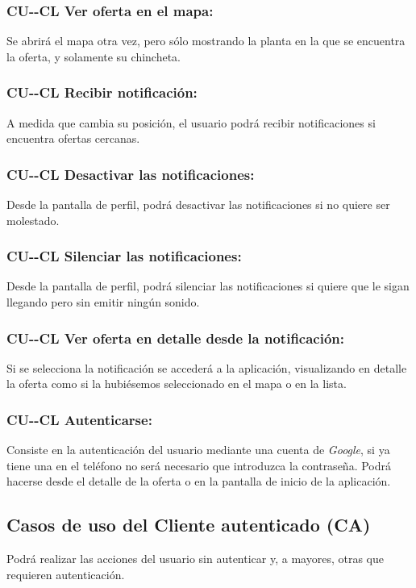 \subsubsection*{CU-\theUseCase-CL Ver oferta en el mapa:}
Se abrirá el mapa otra vez, pero sólo mostrando la planta en la que se encuentra la oferta, y solamente su chincheta.
\subsubsection*{CU-\theUseCase-CL Recibir notificación:}
A medida que cambia su posición, el usuario podrá recibir notificaciones si encuentra ofertas cercanas.
\subsubsection*{CU-\theUseCase-CL Desactivar las notificaciones:}
Desde la pantalla de perfil, podrá desactivar las notificaciones si no quiere ser molestado.
\subsubsection*{CU-\theUseCase-CL Silenciar las notificaciones:}
Desde la pantalla de perfil, podrá silenciar las notificaciones si quiere que le sigan llegando pero sin emitir ningún sonido.
\subsubsection*{CU-\theUseCase-CL Ver oferta en detalle desde la notificación:}
Si se selecciona la notificación se accederá a la aplicación, visualizando en detalle la oferta como si la hubiésemos seleccionado en el mapa o en la lista.
\subsubsection*{CU-\theUseCase-CL Autenticarse:}
Consiste en la autenticación del usuario mediante una cuenta de \textit{Google}, si ya tiene una en el teléfono no será necesario que introduzca la contraseña. Podrá hacerse desde el detalle de la oferta o en la pantalla de inicio de la aplicación.
\subsection*{Casos de uso del Cliente autenticado (CA)}
Podrá realizar las acciones del usuario sin autenticar y, a mayores, otras que requieren autenticación.
